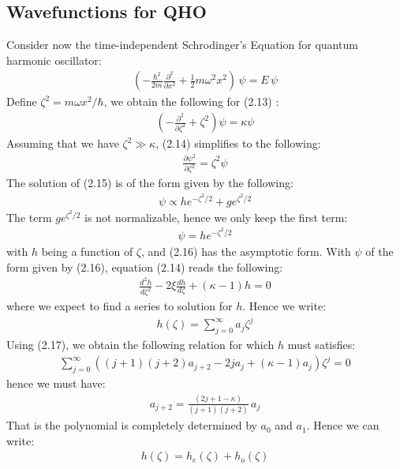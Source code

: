 \documentclass[11pt]{book}
\theoremstyle{break}
\theoremstyle{break}
\newcommand{\pd}{\partial}
\begin{document}
\newpage
\subsection{Wavefunctions for QHO}
Consider now the time-independent Schrodinger's Equation for quantum harmonic oscillator:
\begin{align}
\left( - \frac{\hbar^2}{2m}\frac{\pd^2}{\pd x^2} + \frac{1}{2}m \omega^2 x^2\right) \,\psi = E\,\psi
\end{align}
Define $\zeta^2 = m\omega x^2 / \hbar$, we obtain the following for (2.13) :
\begin{align}
\left( - \frac{\pd^2}{\pd \zeta^2} + \zeta^2 \right) \psi = \kappa \psi
\end{align}
Assuming that we have $\zeta^2 \gg \kappa$, (2.14) simplifies to the following:
\begin{align}
\frac{\pd \psi^2}{\pd \zeta^2} = \zeta^2 \psi
\end{align}
The solution of (2.15) is of the form given by the following:
\begin{align*}
\psi\propto he^{-\zeta^2/2} + g e^{\zeta^2/2}
\end{align*}
The term $ g e^{\zeta^2/2}$ is not normalizable, hence we only keep the first term:
\begin{align}
\psi= he^{-\zeta^2/2} 
\end{align}
with $h$ being a function of $\zeta$, and (2.16) has the asymptotic form. With $\psi$ of the form given by (2.16), equation (2.14) reads the following:
\begin{align}
\frac{d^2 h}{d\zeta^2} - 2\xi \frac{dh}{d\zeta}+ (\kappa - 1) h = 0
\end{align}
where we expect to find a series to solution for $h$. Hence we write:
\begin{align*}
h(\zeta) = \sum_{j=0}^\infty a_j \zeta^j
\end{align*}
Using (2.17), we obtain the following relation for which $h$ must satisfies:
\begin{align}
\sum_{j=0}^\infty \left( (j+1) (j+2) a_{j+2} - 2ja_j + (\kappa - 1) a_j\right)\zeta^j = 0
\end{align}
hence we must have:
\begin{align}
a_{j+2} = \frac{(2j+1 - \kappa)}{(j+1)(j+2)}\, a_j
\end{align}
That is the polynomial is completely determined by $a_0$ and $a_1$. Hence we can write:
\begin{align*}
h(\zeta) = h_e(\zeta) + h_o(\zeta)
\end{align*}
\end{document}
